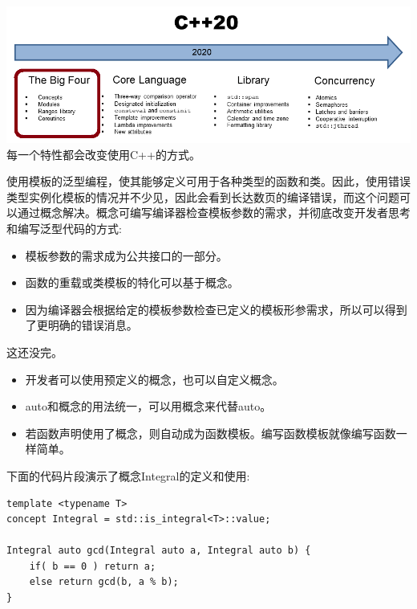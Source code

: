 


\begin{center}
\includegraphics[width=1.0\textwidth]{content/2/chapter3/images/2.png}\\
每一个特性都会改变使用C++的方式。
\end{center}


使用模板的泛型编程，使其能够定义可用于各种类型的函数和类。因此，使用错误类型实例化模板的情况并不少见，因此会看到长达数页的编译错误，而这个问题可以通过概念解决。概念可编写编译器检查模板参数的需求，并彻底改变开发者思考和编写泛型代码的方式:

\begin{itemize}
\item 
模板参数的需求成为公共接口的一部分。

\item 
函数的重载或类模板的特化可以基于概念。

\item 
因为编译器会根据给定的模板参数检查已定义的模板形参需求，所以可以得到了更明确的错误消息。
\end{itemize}

这还没完。

\begin{itemize}
\item 
开发者可以使用预定义的概念，也可以自定义概念。

\item 
auto和概念的用法统一，可以用概念来代替auto。

\item 
若函数声明使用了概念，则自动成为函数模板。编写函数模板就像编写函数一样简单。
\end{itemize}

下面的代码片段演示了概念Integral的定义和使用:

\begin{lstlisting}[style=styleCXX]
template <typename T>
concept Integral = std::is_integral<T>::value;

Integral auto gcd(Integral auto a, Integral auto b) {
	if( b == 0 ) return a;
	else return gcd(b, a % b);
}
\end{lstlisting}

